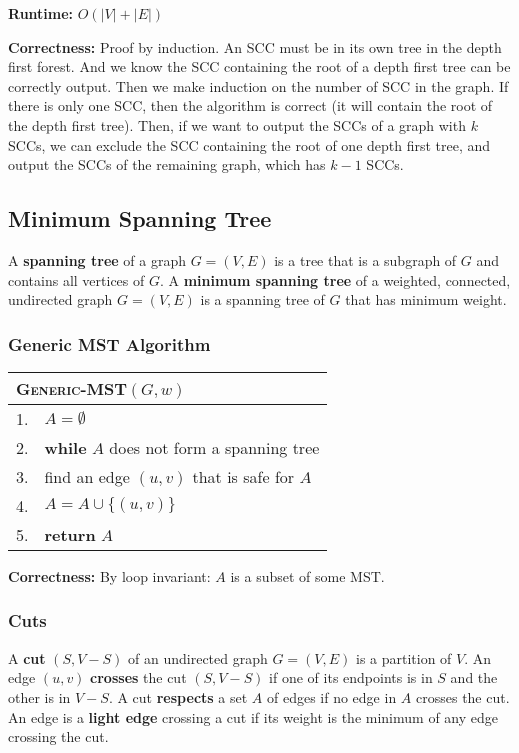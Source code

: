 \documentclass[a4paper,12pt]{article}
\begin{document}
\textbf{Runtime:}
$O(|V| + |E|)$

\textbf{Correctness:}
Proof by induction.
An SCC must be in its own tree in the depth first forest.
And we know the SCC containing the root of a depth first tree can be correctly output.
Then we make induction on the number of SCC in the graph.
If there is only one SCC, then the algorithm is correct (it will contain the root of the depth first tree).
Then, if we want to output the SCCs of a graph with $k$ SCCs, we can exclude the SCC containing the root of one depth first tree, and output the SCCs of the remaining graph, which has $k - 1$ SCCs.

\subsection{Minimum Spanning Tree}

A \textbf{spanning tree} of a graph $G = (V, E)$ is a tree that is a subgraph of $G$ and contains all vertices of $G$.
A \textbf{minimum spanning tree} of a weighted, connected, undirected graph $G = (V, E)$ is a spanning tree of $G$ that has minimum weight.

\subsubsection{Generic MST Algorithm}

\begin{center}
	\begin{tabular}{rl}
		\toprule
		\multicolumn{2}{l}{\textsc{Generic-MST}$(G, w)$} \\
		\midrule
		1. & $A = \emptyset$ \\
		2. & \textbf{while} $A$ does not form a spanning tree \\
		3. & \quad find an edge $(u, v)$ that is safe for $A$ \\
		4. & \quad $A = A \cup \{(u, v)\}$ \\
		5. & \textbf{return} $A$ \\
		\bottomrule
	\end{tabular}
\end{center}

\textbf{Correctness:}
By loop invariant:
$A$ is a subset of some MST.

\subsubsection{Cuts}

A \textbf{cut} $(S, V - S)$ of an undirected graph $G = (V, E)$ is a partition of $V$.
An edge $(u, v)$ \textbf{crosses} the cut $(S, V - S)$ if one of its endpoints is in $S$ and the other is in $V - S$.
A cut \textbf{respects} a set $A$ of edges if no edge in $A$ crosses the cut.
An edge is a \textbf{light edge} crossing a cut if its weight is the minimum of any edge crossing the cut.
\end{document}
